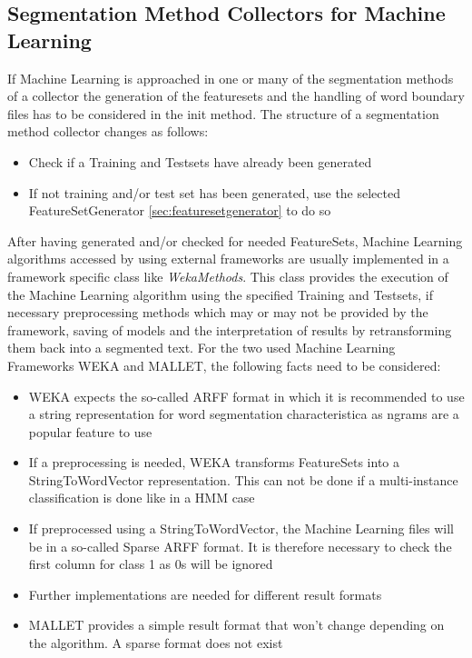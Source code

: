 \documentclass[10pt,a4paper,titlepage]{report}
\begin{document}
	\subsection{Segmentation Method Collectors for Machine Learning}
	If Machine Learning is approached in one or many of the segmentation methods of a collector the generation of the featuresets and the handling of word boundary files has to be considered in the init method. The structure of a segmentation method collector changes as follows:
	\begin{itemize}
		\item Check if a Training and Testsets have already been generated
		\item If not training and/or test set has been generated, use the selected FeatureSetGenerator \ref{sec:featuresetgenerator} to do so
	\end{itemize}
	After having generated and/or checked for needed FeatureSets, Machine Learning algorithms accessed by using external frameworks are usually implemented in a framework specific class like \textit{WekaMethods}. This class provides the execution of the Machine Learning algorithm using the specified Training and Testsets, if necessary preprocessing methods which may or may not be provided by the framework, saving of models and the interpretation of results by retransforming them back into a segmented text.
	For the two used Machine Learning Frameworks WEKA and MALLET, the following facts need to be considered:
	\begin{itemize}
		\item WEKA expects the so-called ARFF format in which it is recommended to use a string representation for word segmentation characteristica as ngrams are a popular feature to use
		\item If a preprocessing is needed, WEKA transforms FeatureSets into a StringToWordVector representation. This can not be done if a multi-instance classification is done like in a HMM case
		\item If preprocessed using a StringToWordVector, the Machine Learning files will be in a so-called Sparse ARFF format. It is therefore necessary to check the first column for class 1 as 0s will be ignored
		\item Further implementations are needed for different result formats
		\item MALLET provides a simple result format that won't change depending on the algorithm. A sparse format does not exist	
	\end{itemize}
\end{document}
